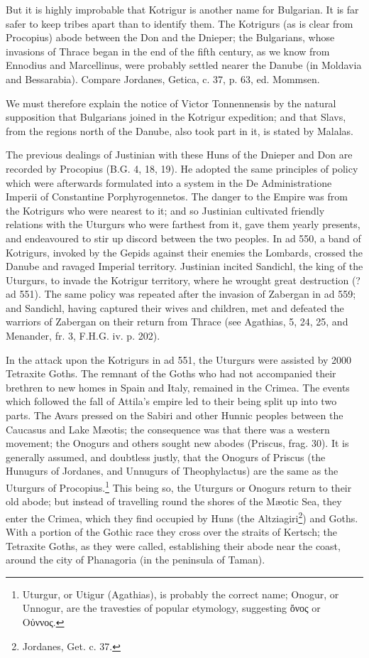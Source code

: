 But it is highly improbable that Kotrigur is another name for Bulgarian. It is far safer to keep tribes apart than to identify them. The Kotrigurs (as is clear from Procopius) abode between the Don and the Dnieper; the Bulgarians, whose invasions of Thrace began in the end of the fifth century, as we know from Ennodius and Marcellinus, were probably settled nearer the Danube (in Moldavia and Bessarabia). Compare Jordanes, Getica, c. 37, p. 63, ed. Mommsen.

We must therefore explain the notice of Victor Tonnennensis by the natural supposition that Bulgarians joined in the Kotrigur expedition; and that Slavs, from the regions north of the Danube, also took part in it, is stated by Malalas.

The previous dealings of Justinian with these Huns of the Dnieper and Don are recorded by Procopius (B.G. 4, 18, 19). He adopted the same principles of policy which were afterwards formulated into a system in the De Administratione Imperii of Constantine Porphyrogennetos. The danger to the Empire was from the Kotrigurs who were nearest to it; and so Justinian cultivated friendly relations with the Uturgurs who were farthest from it, gave them yearly presents, and endeavoured to stir up discord between the two peoples. In ad 550, a band of Kotrigurs, invoked by the Gepids against their enemies the Lombards, crossed the Danube and ravaged Imperial territory. Justinian incited Sandichl, the king of the Uturgurs, to invade the Kotrigur territory, where he wrought great destruction (? ad 551). The same policy was repeated after the invasion of Zabergan in ad 559; and Sandichl, having captured their wives and children, met and defeated the warriors of Zabergan on their return from Thrace (see Agathias, 5, 24, 25, and Menander, fr. 3, F.H.G. iv. p. 202).

In the attack upon the Kotrigurs in ad 551, the Uturgurs were assisted by 2000 Tetraxite Goths. The remnant of the Goths who had not accompanied their brethren to new homes in Spain and Italy, remained in the Crimea. The events which followed the fall of Attila\texthebrew{}’s empire led to their being split up into two parts. The Avars pressed on the Sabiri and other Hunnic peoples between the Caucasus and Lake Mæotis; the consequence was that there was a western movement; the Onogurs and others sought new abodes (Priscus, frag. 30). It is generally assumed, and doubtless justly, that the Onogurs of Priscus (the Hunugurs of Jordanes, and Unnugurs of Theophylactus) are the same as the Uturgurs of Procopius.\footnote{Uturgur, or Utigur (Agathias), is probably the correct name; Onogur, or Unnogur, are the travesties of popular etymology, suggesting \textgreek{\texthebrew{ὄ}νος} or \textgreek{Ο\texthebrew{ὐ}ννος}.} This being so, the Uturgurs or Onogurs return to their old abode; but instead of travelling round the shores of the Mæotic Sea, they enter the Crimea, which they find occupied by Huns (the Altziagiri\footnote{Jordanes, Get. c. 37.}) and Goths. With a portion of the Gothic race they cross over the straits of Kertsch; the Tetraxite Goths, as they were called, establishing their abode near the coast, around the city of Phanagoria (in the peninsula of Taman).

